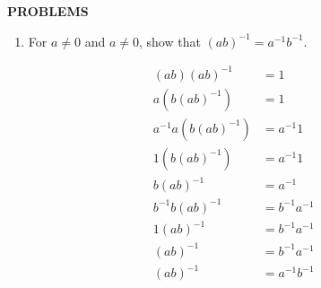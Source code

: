 \begin{center}
	\textbf{PROBLEMS}
\end{center}
\begin{enumerate}
	\setcounter{enumi}{0}
	\item For $a\neq 0$ and $a\neq 0$, show that $(ab)^{-1} = a^{-1}b^{-1}$.\par

		\begin{align*}
			(ab)(ab)^{-1} & = 1 && \tag*{by multiplicative inverse}\\
			a(b(ab)^{-1}) & = 1 && \tag*{by associativity of multiplication} \\
			a^{-1}a(b(ab)^{-1}) & = a^{-1}1 \\
			1(b(ab)^{-1}) & = a^{-1}1 && \tag*{by multiplicative inverse} \\
			b(ab)^{-1} & = a^{-1} && \tag*{by multiplicative identity} \\
			b^{-1}b(ab)^{-1} & = b^{-1}a^{-1} \\
			1(ab)^{-1} & = b^{-1}a^{-1} && \tag*{by multiplicative inverse} \\
			(ab)^{-1} & = b^{-1}a^{-1} && \tag*{by multiplicative identity} \\
			(ab)^{-1} & = a^{-1}b^{-1} && \tag*{by commutativity of multiplication} \\
		\end{align*}


\end{enumerate}
